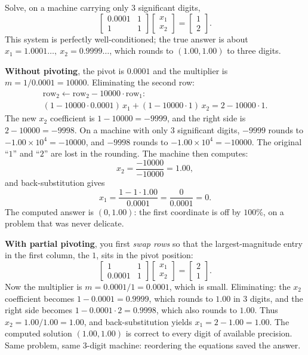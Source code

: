 \begin{example}
\label{ch33:pivot}
Solve, on a machine carrying only $3$ significant digits,
\[
  \begin{bmatrix} 0.0001 & 1 \\ 1 & 1 \end{bmatrix}
  \begin{bmatrix} x_1 \\ x_2 \end{bmatrix} =
  \begin{bmatrix} 1 \\ 2 \end{bmatrix}.
\]
This system is perfectly well-conditioned; the true answer is about
$x_1 = 1.0001\ldots,\ x_2 = 0.9999\ldots$, which rounds to $(1.00, 1.00)$ to three
digits.

\textbf{Without pivoting}, the pivot is $0.0001$ and the multiplier is
$m = 1/0.0001 = 10000$. Eliminating the second row:
\[
  \begin{gathered}
  \text{row}_2 \leftarrow \text{row}_2 - 10000\cdot\text{row}_1:\\
  (1 - 10000\cdot 0.0001)\,x_1 + (1 - 10000\cdot 1)\,x_2 = 2 - 10000\cdot 1.
  \end{gathered}
\]
The new $x_2$ coefficient is $1 - 10000 = -9999$, and the right side is $2-10000=-9998$.
On a machine with only $3$ significant digits, $-9999$ rounds to $-1.00 \times 10^4 =
-10000$, and $-9998$ rounds to $-1.00 \times 10^4 = -10000$. The original ``$1$'' and
``$2$'' are lost in the rounding. The machine then computes:
\[
  x_2 = \frac{-10000}{-10000} = 1.00,
\]
and back-substitution gives
\[
  x_1 = \frac{1 - 1\cdot 1.00}{0.0001} = \frac{0}{0.0001} = 0.
\]
The computed answer is $(0, 1.00)$: the first coordinate is off by $100\%$, on a
problem that was never delicate.

\textbf{With partial pivoting}, you first \emph{swap rows} so that the largest-magnitude
entry in the first column, the $1$, sits in the pivot position:
\[
  \begin{bmatrix} 1 & 1 \\ 0.0001 & 1 \end{bmatrix}
  \begin{bmatrix} x_1 \\ x_2 \end{bmatrix} =
  \begin{bmatrix} 2 \\ 1 \end{bmatrix}.
\]
Now the multiplier is $m = 0.0001/1 = 0.0001$, which is small. Eliminating:
the $x_2$ coefficient becomes $1 - 0.0001 = 0.9999$, which rounds to $1.00$ in $3$
digits, and the right side becomes $1 - 0.0001\cdot 2 = 0.9998$, which also rounds to
$1.00$. Thus $x_2 = 1.00/1.00 = 1.00$, and back-substitution yields
$x_1 = 2 - 1.00 = 1.00$. The computed solution $(1.00, 1.00)$ is correct to every digit
of available precision. Same problem, same $3$-digit machine: reordering the
equations saved the answer.
\end{example}

